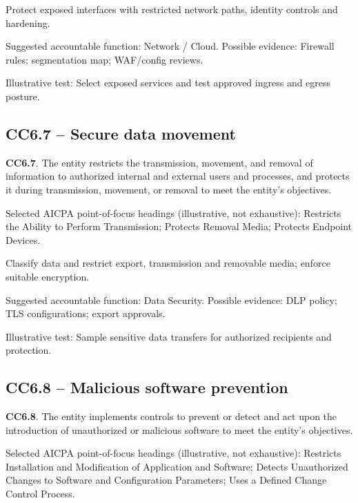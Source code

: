 \documentclass[10pt,oneside]{report}
\begin{document}
\begin{engineeringbox}
Protect exposed interfaces with restricted network paths, identity controls and hardening.
\end{engineeringbox}
Suggested accountable function: Network / Cloud. Possible evidence: Firewall rules; segmentation map; WAF/config reviews.

Illustrative test: Select exposed services and test approved ingress and egress posture.

\subsection*{CC6.7 -- Secure data movement}
\begin{aicpabox}
\textbf{CC6.7}. The entity restricts the transmission, movement, and removal of information to authorized internal and external users and processes, and protects it during transmission, movement, or removal to meet the entity's objectives.\par{}
\end{aicpabox}
Selected AICPA point-of-focus headings (illustrative, not exhaustive): Restricts the Ability to Perform Transmission; Protects Removal Media; Protects Endpoint Devices.

\begin{engineeringbox}
Classify data and restrict export, transmission and removable media; enforce suitable encryption.
\end{engineeringbox}
Suggested accountable function: Data Security. Possible evidence: DLP policy; TLS configurations; export approvals.

Illustrative test: Sample sensitive data transfers for authorized recipients and protection.

\subsection*{CC6.8 -- Malicious software prevention}
\begin{aicpabox}
\textbf{CC6.8}. The entity implements controls to prevent or detect and act upon the introduction of unauthorized or malicious software to meet the entity's objectives.\par{}
\end{aicpabox}
Selected AICPA point-of-focus headings (illustrative, not exhaustive): Restricts Installation and Modification of Application and Software; Detects Unauthorized Changes to Software and Configuration Parameters; Uses a Defined Change Control Process.
\end{document}
